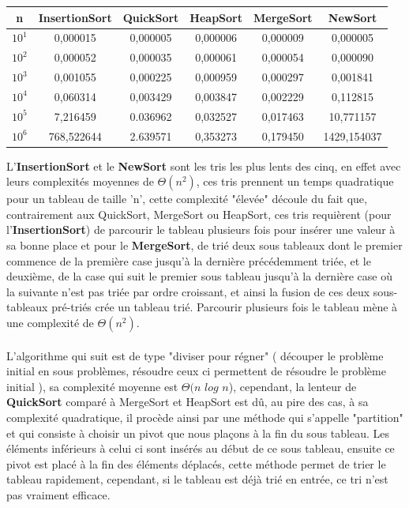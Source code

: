\documentclass[a4paper, 11pt, oneside]{article}
\begin{document}
\begin{table}[htb]
\begin{tabular}{cccccc}
\hline

n   & InsertionSort & QuickSort & HeapSort & MergeSort & NewSort \\ \hline
$10^{1}$ & 0,000015      & 0,000005  & 0,000006         & 0,000009          & 0,000005        \\
$10^{2}$ & 0,000052      & 0,000035  & 0,000061         & 0,000054          & 0,000090        \\
$10^{3}$ & 0,001055      & 0,000225  & 0,000959         & 0,000297          & 0,001841        \\
$10^{4}$ & 0,060314      & 0,003429  & 0,003847         & 0,002229          & 0,112815        \\
$10^{5}$ & 7,216459      & 0.036962  & 0,032527         & 0,017463           & 10,771157        \\
$10^{6}$ & 768,522644    & 2.639571  & 0,353273         & 0,179450          & 1429,154037
        
\end{tabular}
\end{table}

L'\textbf{InsertionSort} et le \textbf{NewSort} sont les tris les plus lents des cinq, en effet avec leurs complexités moyennes de $\Theta(n^{2})$, ces tris prennent un temps quadratique pour un tableau de taille 'n', cette complexité "élevée" découle du fait que, contrairement aux QuickSort, MergeSort ou HeapSort, ces tris requièrent (pour l'\textbf{InsertionSort}) de parcourir le tableau plusieurs fois pour insérer une valeur à sa bonne place et pour le \textbf{MergeSort}, de trié deux sous tableaux dont le premier commence de la première case jusqu'à la dernière précédemment triée, et le deuxième, de la case qui suit le premier sous tableau jusqu'à la dernière case où la suivante  n'est pas triée par ordre croissant, et ainsi la fusion de ces deux sous-tableaux pré-triés crée un tableau trié.
 Parcourir plusieurs fois le tableau mène à une complexité de $\Theta(n^{2})$.
\\
\\
\indent L'algorithme qui suit est de type "diviser pour régner" ( découper le problème initial en sous problèmes, résoudre ceux ci permettent de résoudre le problème initial ), sa complexité moyenne est $\Theta(n$ $log$ $n$), cependant, la lenteur de \textbf{QuickSort} comparé à MergeSort et HeapSort est dû, au pire des cas, à sa complexité quadratique, il procède ainsi par une méthode qui s'appelle "partition" et qui consiste à choisir un pivot que nous plaçons à la fin du sous tableau. Les éléments inférieurs à celui ci sont insérés au début de ce sous tableau, ensuite ce pivot est placé à la fin des éléments déplacés, cette méthode permet de trier le tableau rapidement, cependant, si le tableau est déjà trié en entrée, ce tri n'est pas vraiment efficace.\\ 
\end{document}
